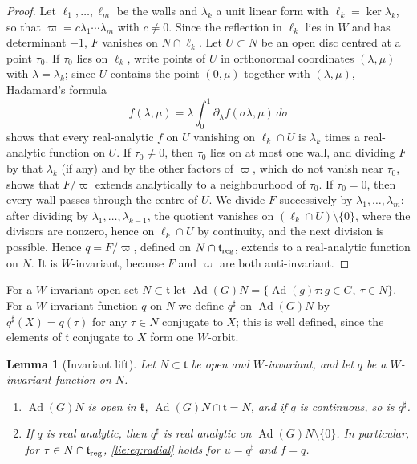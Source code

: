 \documentclass[11pt]{amsart}
\newtheorem{lemma}[theorem]{Lemma}
\theoremstyle{definition}
\theoremstyle{remark}
\numberwithin{equation}{section}
\newcommand{\Ad}{\operatorname{Ad}}
\newcommand{\kf}{\mathfrak{k}}
\newcommand{\tf}{\mathfrak{t}}
\begin{document}
\begin{proof}
Let $\ell_1,\ldots,\ell_m$ be the walls and $\lambda_k$ a unit linear form with $\ell_k=\ker\lambda_k$, so that $\varpi=c\lambda_1\cdots\lambda_m$ with $c\neq0$. Since the reflection in $\ell_k$ lies in $W$ and has determinant $-1$, $F$ vanishes on $N\cap\ell_k$. Let $U\subset N$ be an open disc centred at a point $\tau_0$. If $\tau_0$ lies on $\ell_k$, write points of $U$ in orthonormal coordinates $(\lambda,\mu)$ with $\lambda=\lambda_k$; since $U$ contains the point $(0,\mu)$ together with $(\lambda,\mu)$, Hadamard's formula
\[
f(\lambda,\mu)=\lambda\int_0^1\partial_\lambda f(\sigma\lambda,\mu)\,d\sigma
\]
shows that every real-analytic $f$ on $U$ vanishing on $\ell_k\cap U$ is $\lambda_k$ times a real-analytic function on $U$. If $\tau_0\neq0$, then $\tau_0$ lies on at most one wall, and dividing $F$ by that $\lambda_k$ (if any) and by the other factors of $\varpi$, which do not vanish near $\tau_0$, shows that $F/\varpi$ extends analytically to a neighbourhood of $\tau_0$. If $\tau_0=0$, then every wall passes through the centre of $U$. We divide $F$ successively by $\lambda_1,\ldots,\lambda_m$: after dividing by $\lambda_1,\ldots,\lambda_{k-1}$, the quotient vanishes on $(\ell_k\cap U)\setminus\{0\}$, where the divisors are nonzero, hence on $\ell_k\cap U$ by continuity, and the next division is possible. Hence $q=F/\varpi$, defined on $N\cap\tf_{\rm reg}$, extends to a real-analytic function on $N$. It is $W$-invariant, because $F$ and $\varpi$ are both anti-invariant.
\end{proof}

For a $W$-invariant open set $N\subset\tf$ let $\Ad(G)N=\{\Ad(g)\tau:g\in G,\ \tau\in N\}$. For a $W$-invariant function $q$ on $N$ we define $q^\sharp$ on $\Ad(G)N$ by $q^\sharp(X)=q(\tau)$ for any $\tau\in N$ conjugate to $X$; this is well defined, since the elements of $\tf$ conjugate to $X$ form one $W$-orbit.

\begin{lemma}[Invariant lift]\label{lie:lem:inv}
Let $N\subset\tf$ be open and $W$-invariant, and let $q$ be a $W$-invariant function on $N$.
\begin{enumerate}[label=\textup{(\alph*)}]
\item $\Ad(G)N$ is open in $\kf$, $\Ad(G)N\cap\tf=N$, and if $q$ is continuous, so is $q^\sharp$.
\item If $q$ is real analytic, then $q^\sharp$ is real analytic on $\Ad(G)N\setminus\{0\}$. In particular, for $\tau\in N\cap\tf_{\rm reg}$, \eqref{lie:eq:radial} holds for $u=q^\sharp$ and $f=q$.
\end{enumerate}
\end{lemma}
\end{document}
